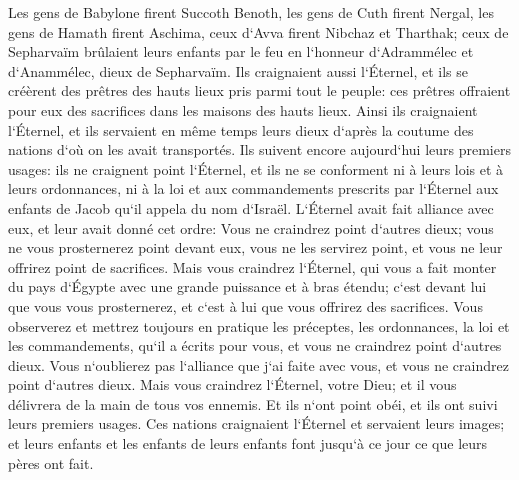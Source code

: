 \verse Les gens de Babylone firent Succoth Benoth, les gens de Cuth firent Nergal, les gens de Hamath firent Aschima, 
\verse ceux d`Avva firent Nibchaz et Tharthak; ceux de Sepharvaïm brûlaient leurs enfants par le feu en l`honneur d`Adrammélec et d`Anammélec, dieux de Sepharvaïm. 
\verse Ils craignaient aussi l`Éternel, et ils se créèrent des prêtres des hauts lieux pris parmi tout le peuple: ces prêtres offraient pour eux des sacrifices dans les maisons des hauts lieux. 
\verse Ainsi ils craignaient l`Éternel, et ils servaient en même temps leurs dieux d`après la coutume des nations d`où on les avait transportés. 
\verse Ils suivent encore aujourd`hui leurs premiers usages: ils ne craignent point l`Éternel, et ils ne se conforment ni à leurs lois et à leurs ordonnances, ni à la loi et aux commandements prescrits par l`Éternel aux enfants de Jacob qu`il appela du nom d`Israël. 
\verse L`Éternel avait fait alliance avec eux, et leur avait donné cet ordre: Vous ne craindrez point d`autres dieux; vous ne vous prosternerez point devant eux, vous ne les servirez point, et vous ne leur offrirez point de sacrifices. 
\verse Mais vous craindrez l`Éternel, qui vous a fait monter du pays d`Égypte avec une grande puissance et à bras étendu; c`est devant lui que vous vous prosternerez, et c`est à lui que vous offrirez des sacrifices. 
\verse Vous observerez et mettrez toujours en pratique les préceptes, les ordonnances, la loi et les commandements, qu`il a écrits pour vous, et vous ne craindrez point d`autres dieux. 
\verse Vous n`oublierez pas l`alliance que j`ai faite avec vous, et vous ne craindrez point d`autres dieux. 
\verse Mais vous craindrez l`Éternel, votre Dieu; et il vous délivrera de la main de tous vos ennemis. 
\verse Et ils n`ont point obéi, et ils ont suivi leurs premiers usages. 
\verse Ces nations craignaient l`Éternel et servaient leurs images; et leurs enfants et les enfants de leurs enfants font jusqu`à ce jour ce que leurs pères ont fait. 

\chapter{}

